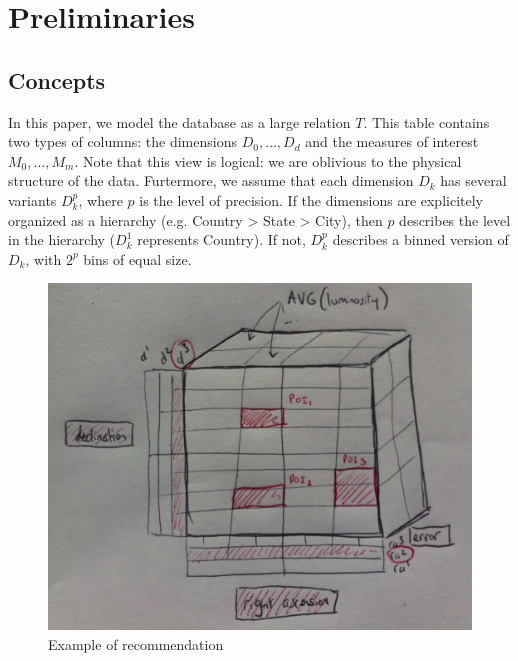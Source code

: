 \section{Preliminaries}

\subsection{Concepts}
In this paper, we model the database as a large relation $T$. This table
contains two types of columns: the dimensions $D_0, \ldots, D_d$ and the
measures of interest $M_0, \ldots, M_m$.  Note that this view is logical: we are oblivious
to the physical structure of the data. Furtermore, we assume that each
dimension $D_k$ has several variants $D_k^p$, where $p$ is the level of
precision.  If the dimensions are explicitely organized as a hierarchy (e.g.
Country > State > City), then $p$ describes the level in the hierarchy ($D_k^1$
represents Country). If not, $D_k^p$ describes a binned version of $D_k$, with $2^p$ bins
of equal size.

\begin{figure}[t!]
\centering
\includegraphics[width=\columnwidth]{images/cube}
\caption{Example of recommendation}
\label{cube}
\end{figure}

